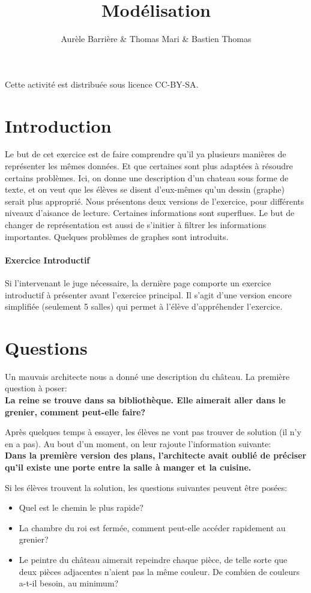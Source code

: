 \documentclass{article}
\title{\vspace{-2cm}Modélisation}
\author{Aurèle Barrière \& Thomas Mari \& Bastien Thomas}
\date{}
\begin{document}
\maketitle

Cette activité est distribuée sous licence CC-BY-SA.

\section{Introduction}
Le but de cet exercice est de faire comprendre qu'il ya plusieurs manières de représenter les mêmes données.
Et que certaines sont plus adaptées à résoudre certains problèmes.
Ici, on donne une description d'un chateau sous forme de texte, et on veut que les élèves se disent d'eux-mêmes qu'un dessin (graphe) serait plus approprié.
Nous présentons deux versions de l'exercice, pour différents niveaux d'aisance de lecture.
Certaines informations sont superflues. Le but de changer de représentation est aussi de s'initier à filtrer les informations importantes.
Quelques problèmes de graphes sont introduits.

\paragraph{Exercice Introductif}
Si l'intervenant le juge nécessaire, la dernière page comporte un exercice introductif à présenter avant l'exercice principal.
Il s'agit d'une version encore simplifiée (seulement 5 salles) qui permet à l'élève d'appréhender l'exercice.

\section{Questions}
Un mauvais architecte nous a donné une description du château.
La première question à poser:\\
\textbf{La reine se trouve dans sa bibliothèque. Elle aimerait aller dans le grenier, comment peut-elle faire?}

Après quelques temps à essayer, les élèves ne vont pas trouver de solution (il n'y en a pas).
Au bout d'un moment, on leur rajoute l'information suivante:\\
\textbf{Dans la première version des plans, l'architecte avait oublié de préciser qu'il existe une porte entre la salle à manger et la cuisine.}

Si les élèves trouvent la solution, les questions suivantes peuvent être posées:
\begin{itemize}
\item Quel est le chemin le plus rapide?
\item La chambre du roi est fermée, comment peut-elle accéder rapidement au grenier?
\item Le peintre du château aimerait repeindre chaque pièce, de telle sorte que deux pièces adjacentes n'aient pas la même couleur. De combien de couleurs a-t-il besoin, au minimum?
\end{itemize}
\end{document}
